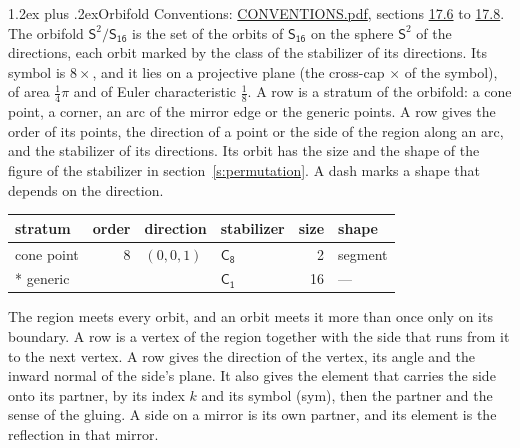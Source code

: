 \documentclass[10pt,a4paper]{article}
\makeatletter
\renewcommand\section{\@startsection{section}{1}{\z@}{-3ex plus -1ex minus -.2ex}%
  {1.2ex plus .2ex}{\normalfont\large\sffamily\bfseries\color{parttitle}}}
\numberwithin{equation}{section}
\newcommand{\grp}[1]{\mathsf{#1}}
\newcommand{\orbname}[1]{#1}
\newcommand{\dirvec}[3]{(#1, #2, #3)}
\newcommand{\twosphere}{\mathsf{S}^{2}}
\makeatother
\begin{document}
\section{Orbifold}\label{s:orbifold}
Conventions: \href{../../CONVENTIONS.pdf}{CONVENTIONS.pdf}, sections \href{../../CONVENTIONS.pdf\#conv.17.6}{17.6} to \href{../../CONVENTIONS.pdf\#conv.17.8}{17.8}.
The orbifold $\twosphere/\grp{S_{16}}$ is the set of the orbits of $\grp{S_{16}}$ on the sphere $\twosphere$ of the directions, each orbit marked by the class of the stabilizer of its directions. Its symbol is $\orbname{8{\times}}$, and it lies on a projective plane (the cross-cap ${\times}$ of the symbol), of area $\tfrac{1}{4}\pi$ and of Euler characteristic $\tfrac{1}{8}$.
\leavevmode\label{n:head.stratum}\label{n:head.order.point}\label{n:head.direction}\label{n:head.stabilizer}\label{n:head.size.orbit}\label{n:head.shape}A row is a stratum of the orbifold: a cone point, a corner, an arc of the mirror edge or the generic points. A row gives the order of its points, the direction of a point or the side of the region along an arc, and the stabilizer of its directions. Its orbit has the size and the shape of the figure of the stabilizer in section~\ref{s:permutation}. A dash marks a shape that depends on the direction.
{\small\setlength{\tabcolsep}{4pt}\begin{longtable}{@{}lrllrl@{}}\toprule
stratum & order & direction & stabilizer & size & shape\\\midrule\endhead
\bottomrule\endfoot\endlastfoot
cone point & 8 & $\dirvec{0}{0}{1}$ & \href{C8.pdf}{$\grp{C_{8}}$} & 2 & segment\\*
generic &  &  & \href{C1.pdf}{$\grp{C_{1}}$} & 16 & ---\\
\bottomrule\end{longtable}}
\leavevmode\label{n:head.vertex.region}\label{n:head.angle}\label{n:head.normal.side}\label{n:head.partner}\label{n:head.sense}The region meets every orbit, and an orbit meets it more than once only on its boundary. A row is a vertex of the region together with the side that runs from it to the next vertex. A row gives the direction of the vertex, its angle and the inward normal of the side's plane. It also gives the element that carries the side onto its partner, by its index $k$ and its symbol (sym), then the partner and the sense of the gluing. A side on a mirror is its own partner, and its element is the reflection in that mirror.
\end{document}
